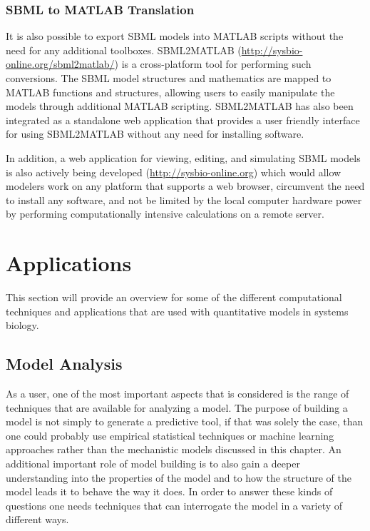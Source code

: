 \documentclass[]{article}
\begin{document}
\subsubsection{SBML to MATLAB Translation}

It is also possible to export SBML models into MATLAB scripts without
the need for any additional toolboxes. SBML2MATLAB
(\url{http://sysbio-online.org/sbml2matlab/}) is a cross-platform tool
for performing such conversions. The SBML model structures and
mathematics are mapped to MATLAB functions and structures, allowing
users to easily manipulate the models through additional MATLAB
scripting. SBML2MATLAB has also been integrated as a standalone web
application that provides a user friendly interface for using
SBML2MATLAB without any need for installing software.

In addition, a web application for viewing, editing, and simulating SBML
models is also actively being developed (\url{http://sysbio-online.org})
which would allow modelers work on any platform that supports a web
browser, circumvent the need to install any software, and not be limited
by the local computer hardware power by performing computationally
intensive calculations on a remote server.

\section{Applications}

This section will provide an overview for some of the different
computational techniques and applications that are used with
quantitative models in systems biology.

\subsection{Model Analysis}

As a user, one of the most important aspects that is considered is the
range of techniques that are available for analyzing a model. The
purpose of building a model is not simply to generate a predictive tool,
if that was solely the case, than one could probably use empirical
statistical techniques or machine learning approaches rather than the
mechanistic models discussed in this chapter. An additional important
role of model building is to also gain a deeper understanding into the
properties of the model and to how the structure of the model leads it
to behave the way it does. In order to answer these kinds of questions
one needs techniques that can interrogate the model in a variety of
different ways.
\end{document}
